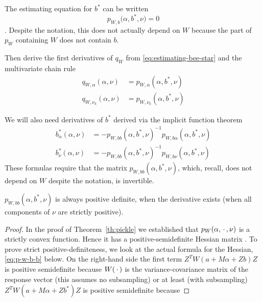 The estimating equation for $b^*$ can be written
\begin{equation} \label{eq:estimating-bee-star}
   p_{W, b}\bigl(\alpha, b^*, \nu\bigr) = 0
\end{equation}
\citep[Section~1.7]{reaster-tr}.  Despite the notation, this does not
actually depend on $W$ because the part of $p_W$ containing $W$ does not
contain $b$.

Then \citet[Section~1.7]{reaster-tr} derive the first derivatives of $q_W$
from \eqref{eq:estimating-bee-star} and the multivariate chain rule
\begin{align}
   q_{W, \alpha}(\alpha, \nu)
   & =
   p_{W, \alpha}(\alpha, b^*, \nu)
   \label{eq:q-alpha}
   \\
   q_{W, \nu_k}(\alpha, \nu)
   & =
   p_{W, \nu_k}(\alpha, b^*, \nu)
   \label{eq:q-nu-k}
\end{align}

We will also need derivatives of $b^*$ derived via the implicit function
theorem \citep[Section~1.8]{reaster}
\begin{align}
   b^*_\alpha(\alpha, \nu)
   & =
   -
   p_{W, b b}(\alpha, b^*, \nu)^{-1} p_{W, b \alpha}(\alpha, b^*, \nu)
   \label{eq:bee-star-alpha}
   \\
   b^*_{\nu}(\alpha, \nu)
   & =
   -
   p_{W, b b}(\alpha, b^*, \nu)^{-1} p_{W, b \nu}(\alpha, b^*, \nu)
   \label{eq:bee-star-nu}
\end{align}
These formulas require that the matrix $p_{W, b b}(\alpha, b^*, \nu)$,
which, recall, does not depend on $W$ despite the notation,
is invertible.
\begin{theorem} \label{th:invertible-bb}
$p_{W, b b}(\alpha, b^*, \nu)$ is always positive definite,
when the derivative exists (when all components of $\nu$
are strictly positive).
\end{theorem}
\begin{proof}
In the proof of Theorem~\ref{th:pickle} we established that
$p_W(\alpha, \,\cdot\,, \nu)$ is a strictly convex function.
Hence it has a positive-semidefinite Hessian matrix
\citep[Theorem~2.14 (c)]{rockafellar-wets}.  To prove strict
positive-definiteness, we look at the actual formula for the
Hessian, \eqref{eq:p-w-b-b} below.  On the right-hand side
the first term $Z^T W(a + M \alpha + Z b) Z$ is positive
semidefinite because $W(\,\cdot\,)$ is the variance-covariance
matrix of the response vector (this assumes no subsampling)
or at least (with subsampling) $Z^T W(a + M \alpha + Z b^*) Z$
is positive semidefinite because 
\end{proof}

